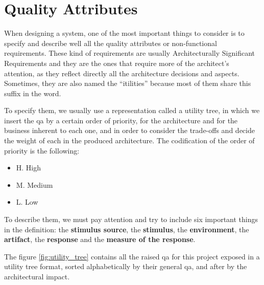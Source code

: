 \section{Quality Attributes}
\label{sec:quality_attributes}

When designing a system, one of the most important things to consider is to specify and describe well all the quality attributes or non-functional requirements. These kind of requirements are usually Architecturally Significant Requirements and they are the ones that require more of the architect's attention, as they reflect directly all the architecture decisions and aspects. Sometimes, they are also named the ``itilities'' because most of them share this suffix in the word.

To specify them, we usually use a representation called a utility tree, in which we insert the \gls{qa} by a certain order of priority, for the architecture and for the business inherent to each one, and in order to consider the trade-offs and decide the weight of each in the produced architecture. The codification of the order of priority is the following:

\begin{itemize}
    \item H. High
    \item M. Medium
    \item L. Low
\end{itemize}

To describe them, we must pay attention and try to include six important things in the definition: the \textbf{stimulus source}, the \textbf{stimulus}, the \textbf{environment}, the \textbf{artifact}, the \textbf{response} and the \textbf{measure of the response}.

The figure \ref{fig:utility_tree} contains all the raised \gls{qa} for this project exposed in a utility tree format, sorted alphabetically by their general \gls{qa}, and after by the architectural impact.

